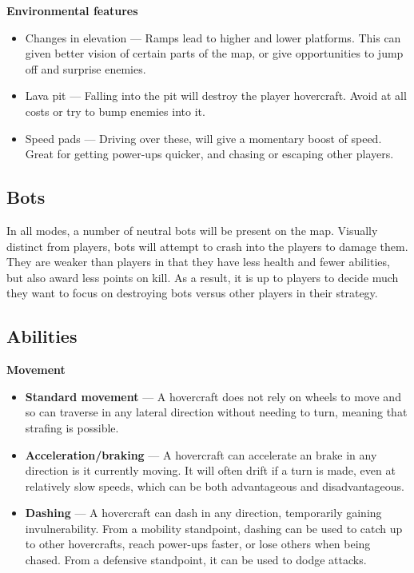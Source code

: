 \documentclass{article}
\theoremstyle{definition}
\begin{document}
\textbf{Environmental features}

\begin{itemize}
  \item Changes in elevation --- Ramps lead to higher and lower platforms. This
    can given better vision of certain parts of the map, or give opportunities
    to jump off and surprise enemies.
  \item Lava pit --- Falling into the pit will destroy the player hovercraft.
    Avoid at all costs or try to bump enemies into it.
  \item Speed pads --- Driving over these, will give a momentary boost of
    speed. Great for getting power-ups quicker, and chasing or escaping other
    players.
\end{itemize}

\subsection{Bots}

In all modes, a number of neutral bots will be present on the map. Visually
distinct from players, bots will attempt to crash into the players to damage
them. They are weaker than players in that they have less health and fewer
abilities, but also award less points on kill. As a result, it is up to players
to decide much they want to focus on destroying bots versus other players in
their strategy.

\subsection{Abilities}

\textbf{Movement}

\begin{itemize}
  \item \textbf{Standard movement} --- A hovercraft does not rely on wheels to
    move and so can traverse in any lateral direction without needing to turn,
    meaning that strafing is possible.
  \item \textbf{Acceleration/braking} --- A hovercraft can accelerate an brake
    in any direction is it currently moving. It will often drift if a turn is
    made, even at relatively slow speeds, which can be both advantageous and
    disadvantageous.
  \item \textbf{Dashing} --- A hovercraft can dash in any direction,
    temporarily gaining invulnerability. From a mobility standpoint, dashing
    can be used to catch up to other hovercrafts, reach power-ups faster, or
    lose others when being chased. From a defensive standpoint, it can be used
    to dodge attacks.
\end{itemize}
\end{document}
